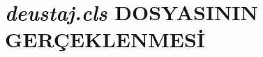 \documentclass{deutez}
\begin{document}
\chapter{\textit{deustaj.cls} DOSYASININ GERÇEKLENMESİ}
\end{document}
